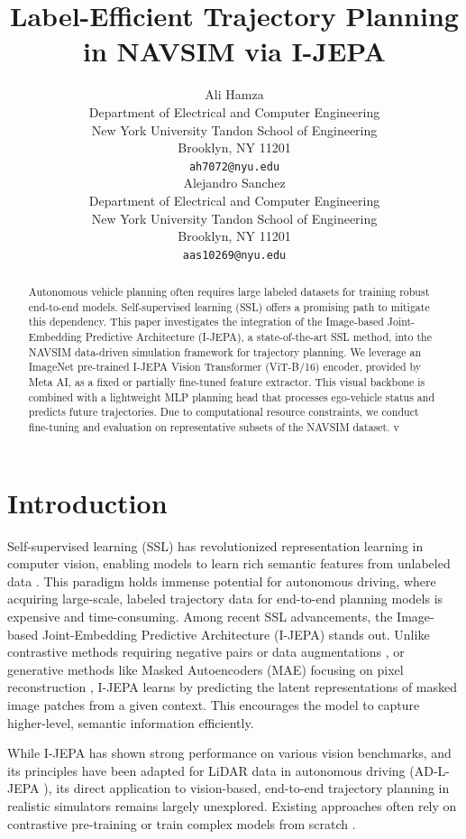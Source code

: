 \documentclass{article}
\title{Label-Efficient Trajectory Planning in NAVSIM via I-JEPA}
\author{%
  Ali Hamza \\
  Department of Electrical and Computer Engineering \\
  New York University Tandon School of Engineering \\
  Brooklyn, NY 11201 \\
  \texttt{ah7072@nyu.edu} \\
  \And
  Alejandro Sanchez \\
  Department of Electrical and Computer Engineering \\
  New York University Tandon School of Engineering \\
  Brooklyn, NY 11201 \\
  \texttt{aas10269@nyu.edu} \\ %
}
\begin{document}
\maketitle

\begin{abstract}
Autonomous vehicle planning often requires large labeled datasets for training robust end-to-end models. Self-supervised learning (SSL) offers a promising path to mitigate this dependency. This paper investigates the integration of the Image-based Joint-Embedding Predictive Architecture (I-JEPA), a state-of-the-art SSL method, into the NAVSIM data-driven simulation framework for trajectory planning. We leverage an ImageNet pre-trained I-JEPA Vision Transformer (ViT-B/16) encoder, provided by Meta AI, as a fixed or partially fine-tuned feature extractor. This visual backbone is combined with a lightweight MLP planning head that processes ego-vehicle status and predicts future trajectories. Due to computational resource constraints, we conduct fine-tuning and evaluation on representative subsets of the NAVSIM dataset. v 
\end{abstract}

\section{Introduction}
Self-supervised learning (SSL) has revolutionized representation learning in computer vision, enabling models to learn rich semantic features from unlabeled data \cite{chen2020simple, grill2020bootstrap, he2022mae, assran2023ijepa}. This paradigm holds immense potential for autonomous driving, where acquiring large-scale, labeled trajectory data for end-to-end planning models is expensive and time-consuming. Among recent SSL advancements, the Image-based Joint-Embedding Predictive Architecture (I-JEPA) \cite{assran2023ijepa} stands out. Unlike contrastive methods requiring negative pairs or data augmentations \cite{chen2020simple, grill2020bootstrap}, or generative methods like Masked Autoencoders (MAE) focusing on pixel reconstruction \cite{he2022mae}, I-JEPA learns by predicting the latent representations of masked image patches from a given context. This encourages the model to capture higher-level, semantic information efficiently.

While I-JEPA has shown strong performance on various vision benchmarks, and its principles have been adapted for LiDAR data in autonomous driving (AD-L-JEPA \cite{adljepa2025}), its direct application to vision-based, end-to-end trajectory planning in realistic simulators remains largely unexplored. Existing approaches often rely on contrastive pre-training \cite{juneja2024dino} or train complex models from scratch \cite{chitta2023transfuser}.
\end{document}
